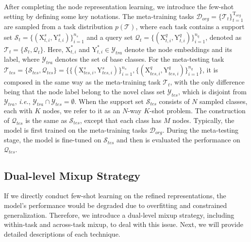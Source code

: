 After completing the node representation learning, we introduce the few-shot setting by defining some key notations. The meta-training tasks $\mathcal{D}_{org}\!=\!\{\mathcal{T}_{t}\}_{t=1}^{\mathrm{T}_{org}}$ are sampled from a task distribution $p(\mathcal{T})$, where each task contains a support set $\mathcal{S}_t\!=\!\{(\mathrm{X}_{t,i}^s,\mathrm{Y}_{t,i}^s)\}_{i=1}^{n_s}$ and a query set $\mathcal{Q}_t\!=\!\{(\mathrm{X}_{t,i}^q,\mathrm{Y}_{t,i}^q)\}_{i=1}^{n_q}$, denoted as $\mathcal{T}_t\!=\!\{\mathcal{S}_t,\mathcal{Q}_t\}$. Here, $\mathrm{X}_{t,i}^\ast$ and $\mathrm{Y}_{t,i}^\ast\!\in\!\mathcal{Y}_{tra}$ denote the node embeddings and its label, where $\mathcal{Y}_{tra}$ denotes the set of base classes. For the meta-testing task $\mathcal{T}_{tes}\!=\!\{\mathcal{S}_{tes},\mathcal{Q}_{tes}\}\!=\!\{\{(\mathrm{X}_{tes,i}^s,\mathrm{Y}_{tes,i}^s)\}_{i=1}^{n_s}, \{(\mathrm{X}_{tes,i}^q,\mathrm{Y}_{tes,i}^q)\}_{i=1}^{n_q}\}$, it is composed in the same way as the meta-training task $\mathcal{T}_t$, with the only difference being that the node label belong to the novel class set $\mathcal{Y}_{tes}$, which is disjoint from $\mathcal{Y}_{tra}$, \textit{i.e.}, $\mathcal{Y}_{tra}\!\cap\!\mathcal{Y}_{tes}\!=\!\emptyset$. When the support set $\mathcal{S}_{tes}$ consists of $N$ sampled classes, each with $K$ nodes, we refer to it as an $N$-way $K$-shot problem. The construction of $\mathcal{Q}_{tes}$ is the same as $\mathcal{S}_{tes}$, except that each class has $M$ nodes. Typically, the model is first trained on the meta-training tasks $\mathcal{D}_{org}$. During the meta-testing stage, the model is fine-tuned on $\mathcal{S}_{tes}$ and then is evaluated the performance on $\mathcal{Q}_{tes}$. 
\subsection{Dual-level Mixup Strategy}

If we directly conduct few-shot learning on the refined representations, the model's performance would be degraded due to overfitting and constrained generalization. Therefore, we introduce a dual-level mixup strategy, including within-task and across-task mixup, to deal with this issue. Next, we will provide detailed descriptions of each technique.

